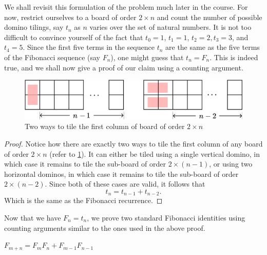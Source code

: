 We shall revisit this formulation of the problem much later in the course. For now, restrict ourselves to a board of order $2\times n$ and count the number of possible domino tilings, say $t_{n}$ as $n$ varies over the set of natural numbers. It is not too difficult to convince yourself of the fact that $t_{0}=1$, $t_{1}=1$, $t_{2}=2, t_{3}=3$, and $t_{4}=5$. Since the first five terms in the sequence $t_{n}$ are the same as the five terms of the Fibonacci sequence (say $F_{n}$), one might guess that $t_{n} = F_{n}$. This is indeed true, and we shall now give a proof of our claim using a counting argument.
\begin{figure}[H]
	\centering
	\includegraphics[scale=0.6]{Images/Figure5.png}
	\caption{Two ways to tile the first column of board of order $2\times n$}
	\label{f:1.4}
\end{figure}
\begin{proof}
	Notice how there are exactly two ways to tile the first column of any board of order $2\times n$ (refer to \cref{f:1.4}). It can either be tiled using a single vertical domino, in which case it remains to tile the sub-board of order $2\times \left( n-1 \right)$, or using two horizontal dominos, in which case it remains to tile the sub-board of order $2\times \left( n-2 \right)$. Since both of these cases are valid, it follows that \[
t_{n}=t_{n-1}+t_{n-2}
.\] Which is the same as the Fibonacci recurrence.
\end{proof}

Now that we have $F_{n}=t_{n}$, we prove two standard Fibonacci identities using counting arguments similar to the ones used in the above proof.

\begin{claim}
$F_{m+n}=F_{m}F_{n} + F_{m-1}F_{n-1}$
\label{c:1.1}
\end{claim}

